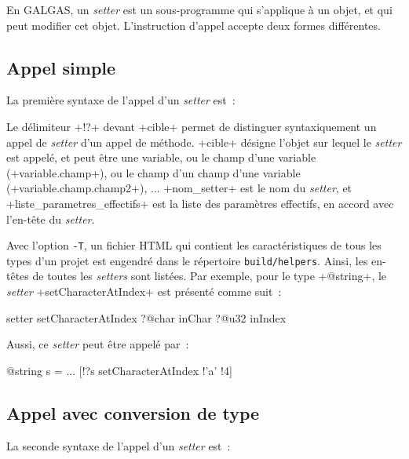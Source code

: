En GALGAS, un \emph{setter} est un sous-programme qui s'applique à un objet, et qui peut modifier cet objet. L'instruction d'appel accepte deux formes différentes.

\subsection{Appel simple}

La première syntaxe de l'appel d'un  \emph{setter} est~:
\begin{galgas4}
\end{galgas4}

Le délimiteur \ggsq+!?+  devant \ggsq+cible+ permet de distinguer syntaxiquement un appel de \emph{setter} d'un appel de méthode. \ggsq+cible+ désigne l'objet sur lequel le \emph{setter} est appelé, et peut être une variable, ou le champ d'une variable (\ggsq+variable.champ+), ou le champ d'un champ d'une variable (\ggsq+variable.champ.champ2+), ... \ggsq+nom_setter+ est le nom du \emph{setter}, et \ggsq+liste_parametres_effectifs+ est la liste des paramètres effectifs, en accord avec l'en-tête du \emph{setter}.

Avec l'option \texttt{-T}, un fichier HTML qui contient les caractéristiques de tous les types d'un projet est engendré dans le répertoire \texttt{build/helpers}. Ainsi, les en-têtes de toutes les \emph{setters} sont listées. Par exemple, pour le type \ggsq+@string+, le \emph{setter} \ggsq+setCharacterAtIndex+ est présenté comme suit~:

\begin{galgas4}
setter setCharacterAtIndex
  ?@char inChar
  ?@u32 inIndex
\end{galgas4}

Aussi, ce \emph{setter} peut être appelé par~:
\begin{galgas4}
@string s = ...
[!?s setCharacterAtIndex !'a' !4]
\end{galgas4}


\subsection{Appel avec conversion de type}

La seconde syntaxe de l'appel d'un  \emph{setter} est~:

\begin{galgas4}
\end{galgas4}

